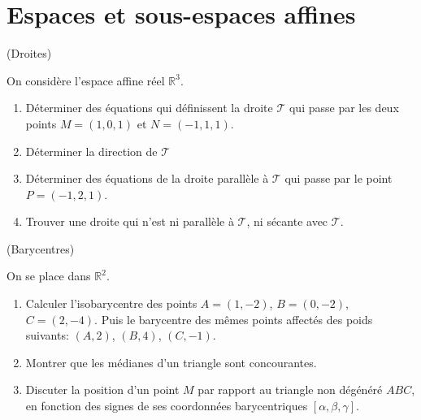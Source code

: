 \documentclass[a4paper,12pt,reqno]{amsart}
\begin{document}

\section{Espaces et sous-espaces affines}

\begin{exo} (Droites)

  On considère l'espace affine réel $\mathbb{R}^{3}$.
  \begin{enumerate}
    \item Déterminer des équations qui définissent la droite $\mathcal{T}$ qui passe par les deux points $M=(1,0,1)$ et $N=(-1,1,1)$.
    \item Déterminer la direction de $\mathcal{T}$
    \item Déterminer des équations de la droite parallèle à $\mathcal{T}$ qui passe par le point $P=(-1,2,1)$.
    \item Trouver une droite qui n'est ni parallèle à $\mathcal{T}$, ni sécante avec $\mathcal{T}$.
  \end{enumerate}
\end{exo}

\begin{exo} (Barycentres)

On se place dans $\mathbb{R}^{2}$.

\begin{enumerate}
  \item Calculer l'isobarycentre des points $A=(1,-2)$, $B=(0,-2)$, $C=(2,-4)$. Puis le barycentre des mêmes points affectés des poids suivants: $(A,2)$, $(B,4)$, $(C,-1)$.

  \item Montrer que les médianes d'un triangle sont concourantes.

  \item Discuter la position d'un point $M$ par rapport au triangle non dégénéré $ABC$, en fonction des signes de ses coordonnées barycentriques $[\alpha, \beta, \gamma]$.

\end{enumerate}

\end{exo}
\end{document}
